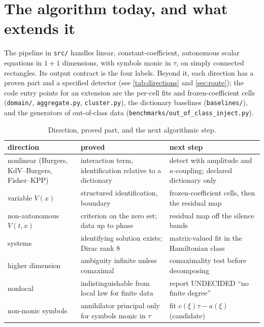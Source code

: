 \documentclass[11pt]{article}
\theoremstyle{plain}
\theoremstyle{definition}
\theoremstyle{remark}
\newcommand{\lab}[1]{\textsf{#1}}           %
\newcommand{\UND}{\lab{UNDECIDED}}
\begin{document}
\section{The algorithm today, and what extends it}\label{sec:algo-state}
The pipeline in \texttt{src/} handles linear, constant-coefficient, autonomous scalar equations in $1{+}1$ dimensions, with symbols monic in $\tau$, on simply connected rectangles. Its output contract is the four labels. Beyond it, each direction has a proven part and a specified detector (see \cref{tab:directions} and \cref{sec:route}); the code entry points for an extension are the per-cell fits and frozen-coefficient cells (\texttt{domain/}, \texttt{aggregate.py}, \texttt{cluster.py}), the dictionary baselines (\texttt{baselines/}), and the generators of out-of-class data (\texttt{benchmarks/out\_of\_class\_inject.py}).
\begin{table}[tbp]
\centering\small
\caption{Direction, proved part, and the next algorithmic step.}\label{tab:algo-next}
\begin{tabular}{@{}p{2.5cm}p{4.5cm}p{4.8cm}@{}}
\toprule
direction & proved & next step\\
\midrule
nonlinear (Burgers, KdV--Burgers, Fisher--KPP) & interaction term, identification relative to a dictionary & detect with amplitude and $\kappa$-coupling; declared dictionary only\\
variable $V(x)$ & structured identification, boundary & frozen-coefficient cells, then the residual map\\
non-autonomous $V(t,x)$ & criterion on the zero set; data up to phase & residual map off the silence bands\\
systems & identifying solution exists; Dirac rank 8 & matrix-valued fit in the Hamiltonian class\\
higher dimension & ambiguity infinite unless comaximal & comaximality test before decomposing\\
nonlocal & indistinguishable from local law for finite data & report \UND{} ``no finite degree''\\
non-monic symbols & annihilator principal only for symbols monic in $\tau$ & fit $c(\xi)\tau-a(\xi)$ (candidate)\\
\bottomrule
\end{tabular}
\end{table}
\end{document}
